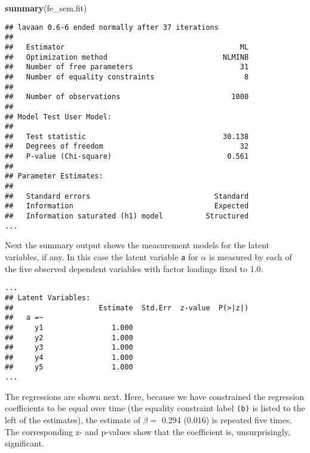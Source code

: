 \documentclass[]{interact}
\theoremstyle{plain}%
\theoremstyle{definition}
\theoremstyle{remark}
\newenvironment{Shaded}{\begin{snugshade}}{\end{snugshade}}
\newcommand{\KeywordTok}[1]{\textcolor[rgb]{0.13,0.29,0.53}{\textbf{#1}}}
\newcommand{\NormalTok}[1]{#1}
\begin{document}
\singlespacing

\begin{Shaded}
\begin{Highlighting}[]
\KeywordTok{summary}\NormalTok{(fe_sem.fit)}
\end{Highlighting}
\end{Shaded}

\begin{verbatim}
## lavaan 0.6-6 ended normally after 37 iterations
## 
##   Estimator                                         ML
##   Optimization method                           NLMINB
##   Number of free parameters                         31
##   Number of equality constraints                     8
##                                                       
##   Number of observations                          1000
##                                                       
## Model Test User Model:
##                                                       
##   Test statistic                                30.138
##   Degrees of freedom                                32
##   P-value (Chi-square)                           0.561
## 
## Parameter Estimates:
## 
##   Standard errors                             Standard
##   Information                                 Expected
##   Information saturated (h1) model          Structured
...
\end{verbatim}

\doublespacing

Next the summary output shows the measurement models for the latent
variables, if any. In this case the latent variable \texttt{a} for
\(\alpha\) is measured by each of the five observed dependent variables
with factor loadings fixed to 1.0.

\singlespacing

\begin{verbatim}
...
## Latent Variables:
##                    Estimate  Std.Err  z-value  P(>|z|)
##   a =~                                                
##     y1                1.000                           
##     y2                1.000                           
##     y3                1.000                           
##     y4                1.000                           
##     y5                1.000                           
...
\end{verbatim}

\doublespacing

The regressions are shown next. Here, because we have constrained the
regression coefficients to be equal over time (the equality constraint
label \texttt{(b)} is listed to the left of the estimates), the estimate
of \(\beta =\) 0.294 (0.016) is repeated five times. The corresponding
z- and p-values show that the coefficient is, unsurprisingly,
significant.
\end{document}
